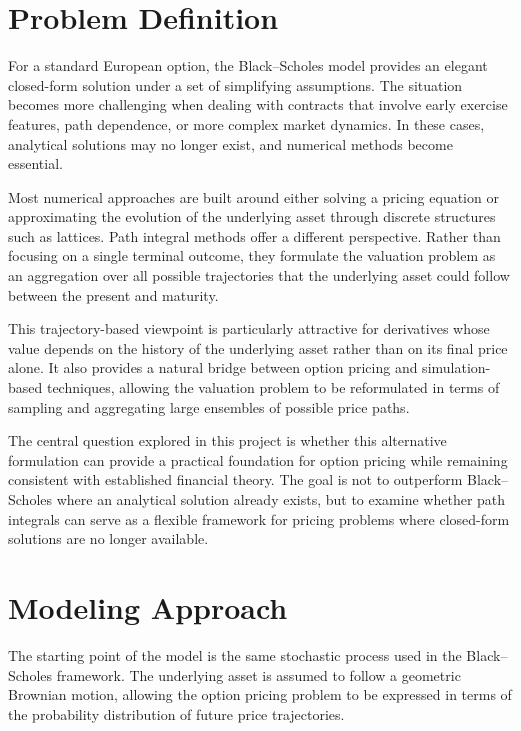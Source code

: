 \documentclass[
  12pt,
  letterpaper,
]{book}
\begin{document}
\section{Problem Definition}\label{problem-definition-2}

For a standard European option, the Black--Scholes model provides an
elegant closed-form solution under a set of simplifying assumptions. The
situation becomes more challenging when dealing with contracts that
involve early exercise features, path dependence, or more complex market
dynamics. In these cases, analytical solutions may no longer exist, and
numerical methods become essential.

Most numerical approaches are built around either solving a pricing
equation or approximating the evolution of the underlying asset through
discrete structures such as lattices. Path integral methods offer a
different perspective. Rather than focusing on a single terminal
outcome, they formulate the valuation problem as an aggregation over all
possible trajectories that the underlying asset could follow between the
present and maturity.

This trajectory-based viewpoint is particularly attractive for
derivatives whose value depends on the history of the underlying asset
rather than on its final price alone. It also provides a natural bridge
between option pricing and simulation-based techniques, allowing the
valuation problem to be reformulated in terms of sampling and
aggregating large ensembles of possible price paths.

The central question explored in this project is whether this
alternative formulation can provide a practical foundation for option
pricing while remaining consistent with established financial theory.
The goal is not to outperform Black--Scholes where an analytical
solution already exists, but to examine whether path integrals can serve
as a flexible framework for pricing problems where closed-form solutions
are no longer available.

\section{Modeling Approach}\label{modeling-approach-2}

The starting point of the model is the same stochastic process used in
the Black--Scholes framework. The underlying asset is assumed to follow
a geometric Brownian motion, allowing the option pricing problem to be
expressed in terms of the probability distribution of future price
trajectories.
\end{document}
